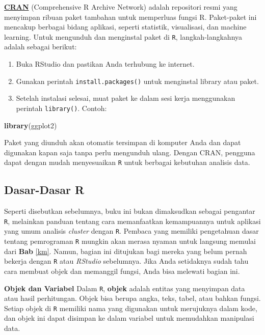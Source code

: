 \documentclass[
  oneside]{book}
\newenvironment{Shaded}{\begin{snugshade}}{\end{snugshade}}
\newcommand{\FunctionTok}[1]{\textcolor[rgb]{0.13,0.29,0.53}{\textbf{#1}}}
\newcommand{\NormalTok}[1]{#1}
\begin{document}
\href{https://cran.r-project.org}{\textbf{CRAN}} (Comprehensive R Archive Network) adalah repositori resmi yang menyimpan ribuan paket tambahan untuk memperluas fungsi R. Paket-paket
ini mencakup berbagai bidang aplikasi, seperti statistik, visualisasi, dan machine learning. Untuk mengunduh dan menginstal paket di \texttt{R}, langkah-langkahnya adalah sebagai berikut:

\begin{enumerate}
\def\labelenumi{\arabic{enumi}.}
\item
  Buka RStudio dan pastikan Anda terhubung ke internet.
\item
  Gunakan perintah \texttt{install.packages()} untuk menginstal library atau
  paket.
\item
  Setelah instalasi selesai, muat paket ke dalam sesi kerja
  menggunakan perintah \texttt{library()}. Contoh:
\end{enumerate}

\begin{Shaded}
\begin{Highlighting}[]
\FunctionTok{library}\NormalTok{(ggplot2)}
\end{Highlighting}
\end{Shaded}

Paket yang diunduh akan otomatis tersimpan di komputer Anda dan dapat
digunakan kapan saja tanpa perlu mengunduh ulang. Dengan CRAN, pengguna
dapat dengan mudah menyesuaikan \texttt{R} untuk berbagai kebutuhan
analisis data.

\subsection*{Dasar-Dasar R}\label{dasar-dasar-r}

Seperti disebutkan sebelumnya, buku ini bukan dimaksudkan sebagai
pengantar \texttt{R}, melainkan panduan tentang cara memanfaatkan
kemampuannya untuk aplikasi yang umum analisis \emph{cluster} dengan
\texttt{R}. Pembaca yang memiliki pengetahuan dasar tentang
pemrograman \texttt{R} mungkin akan merasa nyaman untuk langsung
memulai dari \textbf{Bab} \ref{km}. Namun, bagian ini ditujukan bagi mereka
yang belum pernah bekerja dengan \texttt{R} atau \emph{RStudio}
sebelumnya. Jika Anda setidaknya sudah tahu cara membuat objek dan
memanggil fungsi, Anda bisa melewati bagian ini.

\textbf{Objek dan Variabel} Dalam \texttt{R}, \textbf{objek} adalah entitas
yang menyimpan data atau hasil perhitungan. Objek bisa berupa angka,
teks, tabel, atau bahkan fungsi. Setiap objek di \texttt{R}
memiliki nama yang digunakan untuk merujuknya dalam kode, dan objek ini
dapat disimpan ke dalam variabel untuk memudahkan manipulasi data.
\end{document}
